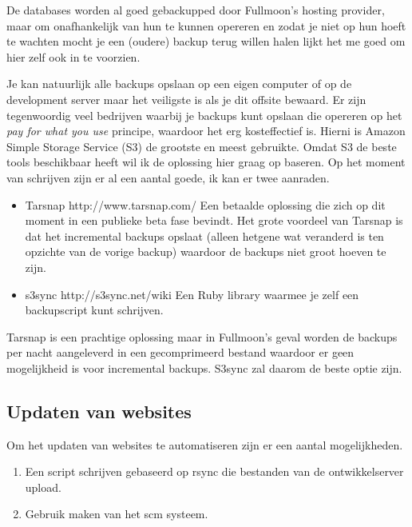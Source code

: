 \documentclass[12pt,a4paper]{article}
\begin{document}
    De databases worden al goed gebackupped door Fullmoon's hosting provider, maar om onafhankelijk van hun te kunnen opereren en zodat je niet op hun hoeft te wachten mocht je een (oudere) backup terug willen halen lijkt het me goed om hier zelf ook in te voorzien.
    
    Je kan natuurlijk alle backups opslaan op een eigen computer of op de development server maar het veiligste is als je dit offsite bewaard. Er zijn tegenwoordig veel bedrijven waarbij je backups kunt opslaan die opereren op het \emph{pay for what you use} principe, waardoor het erg kosteffectief is. Hierni is Amazon Simple Storage Service (S3) de grootste en meest gebruikte. Omdat S3 de beste tools beschikbaar heeft wil ik de oplossing hier graag op baseren. Op het moment van schrijven zijn er al een aantal goede, ik kan er twee aanraden.
        
    \begin{itemize}
      \item Tarsnap http://www.tarsnap.com/ Een betaalde oplossing die zich op dit moment in een publieke beta fase bevindt. Het grote voordeel van Tarsnap is dat het incremental backups opslaat (alleen hetgene wat veranderd is ten opzichte van de vorige backup) waardoor de backups niet groot hoeven te zijn.
      \item s3sync http://s3sync.net/wiki Een Ruby library waarmee je zelf een backupscript kunt schrijven.
    \end{itemize}
    
    Tarsnap is een prachtige oplossing maar in Fullmoon's geval worden de backups per nacht aangeleverd in een gecomprimeerd bestand waardoor er geen mogelijkheid is voor incremental backups. S3sync zal daarom de beste optie zijn. 
    
    \subsection{Updaten van websites}
  
    Om het updaten van websites te automatiseren zijn er een aantal mogelijkheden. 
    
    \begin{enumerate}
      \item Een script schrijven gebaseerd op {\sc rsync} die bestanden van de ontwikkelserver upload.
      \item Gebruik maken van het {\sc scm} systeem.
    \end{enumerate}
    
\end{document}
